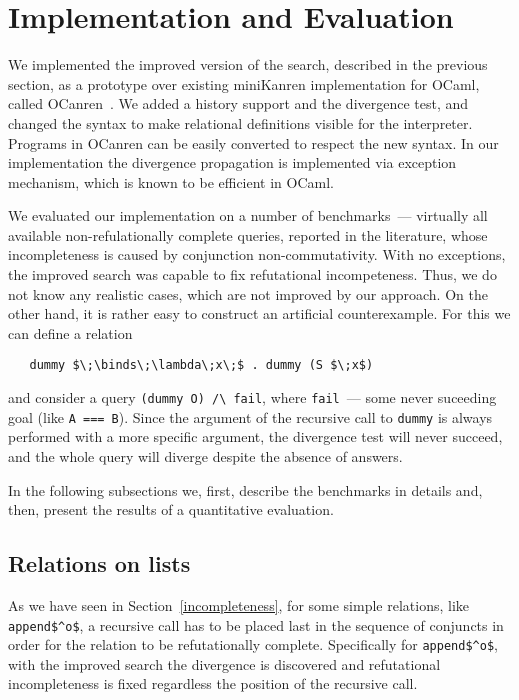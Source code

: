 \section{Implementation and Evaluation}
\label{evaluation}

We implemented the improved version of the search, described in the previous section, 
as a prototype over existing miniKanren implementation for OCaml, called OCanren~\cite{OCanren}. 
We added a history support and the divergence test, and changed the syntax to make relational definitions
visible for the interpreter. Programs in OCanren can be easily converted to respect the new syntax.
In our implementation the divergence propagation is implemented via exception mechanism, which is
known to be efficient in OCaml.

We evaluated our implementation on a number of benchmarks~--- virtually all available non-refulationally
complete queries, reported in the literature, whose incompleteness is caused by conjunction non-commutativity.
With no exceptions, the improved search was capable to fix refutational incompeteness. Thus, we do not know any
realistic cases, which are not improved by our approach. On the other hand, it is rather easy to construct
an artificial counterexample. For this we can define a relation

\begin{lstlisting}
   dummy $\;\binds\;\lambda\;x\;$ . dummy (S $\;x$)
\end{lstlisting}

\noindent and consider a query \lstinline|(dummy O) /\ fail|, where \lstinline|fail|~--- some never
suceeding goal (like \lstinline|A === B|). Since the argument of the recursive call to \lstinline|dummy| is
always performed with a more specific argument, the divergence test will never succeed, and the whole
query will diverge despite the absence of answers. 

In the following subsections we, first, describe the benchmarks in details and, then, present the
results of a quantitative evaluation.

\subsection{Relations on lists}

As we have seen in Section~\ref{incompleteness}, for some simple relations, like \lstinline|append$^o$|,
a recursive call has to be placed last in the sequence of conjuncts in order for the 
relation to be refutationally complete. Specifically for \lstinline|append$^o$|, with the improved search 
the divergence is discovered and refutational incompleteness is fixed regardless the position of 
the recursive call.

